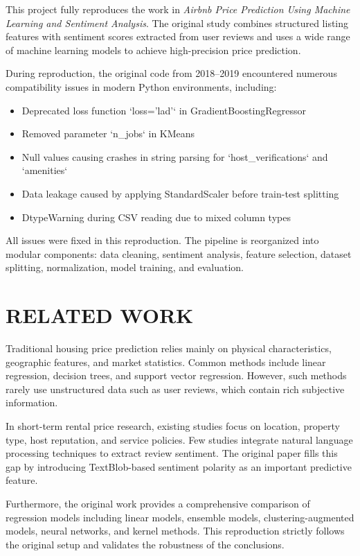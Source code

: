 \documentclass[11pt,a4paper]{article}
\begin{document}
This project fully reproduces the work in \textit{Airbnb Price Prediction Using Machine Learning and Sentiment Analysis}. The original study combines structured listing features with sentiment scores extracted from user reviews and uses a wide range of machine learning models to achieve high-precision price prediction.

During reproduction, the original code from 2018–2019 encountered numerous compatibility issues in modern Python environments, including:
\begin{itemize}
    \item Deprecated loss function `loss='lad'` in GradientBoostingRegressor
    \item Removed parameter `n_jobs` in KMeans
    \item Null values causing crashes in string parsing for `host_verifications` and `amenities`
    \item Data leakage caused by applying StandardScaler before train-test splitting
    \item DtypeWarning during CSV reading due to mixed column types
\end{itemize}

All issues were fixed in this reproduction. The pipeline is reorganized into modular components: data cleaning, sentiment analysis, feature selection, dataset splitting, normalization, model training, and evaluation.

\section{RELATED WORK}
Traditional housing price prediction relies mainly on physical characteristics, geographic features, and market statistics. Common methods include linear regression, decision trees, and support vector regression. However, such methods rarely use unstructured data such as user reviews, which contain rich subjective information.

In short-term rental price research, existing studies focus on location, property type, host reputation, and service policies. Few studies integrate natural language processing techniques to extract review sentiment. The original paper fills this gap by introducing TextBlob-based sentiment polarity as an important predictive feature.

Furthermore, the original work provides a comprehensive comparison of regression models including linear models, ensemble models, clustering-augmented models, neural networks, and kernel methods. This reproduction strictly follows the original setup and validates the robustness of the conclusions.
\end{document}
